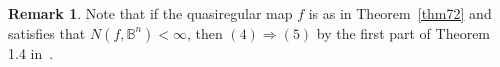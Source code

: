 \documentclass[11pt,a4paper,reqno]{amsart}
\theoremstyle{definition}
\newtheorem{remark}[theorem]{Remark}
\newcommand{\Om}{\Omega}
\newcommand{\B}{\mathbb{B}^n}
\newcommand{\Rn}{{\mathbb R}^n}
\newcommand{\blue}{\color{blau}}
\newcounter{komcounter}
\numberwithin{komcounter}{section}
\newcommand{\komT}[1]{{\bf \blue [\refstepcounter{komcounter}\thekomcounter (by T): #1]}}
\begin{document}
\begin{remark}
 Note that if the quasiregular map $f$ is as in Theorem~\ref {thm72} and satisfies that $N(f,\B)<\infty$, then $(4)\Rightarrow (5)$ by the first part of Theorem 1.4 in~\cite{no}.
\end{remark}

%
%
%
%
%
%
%
%
%
\end{document}
